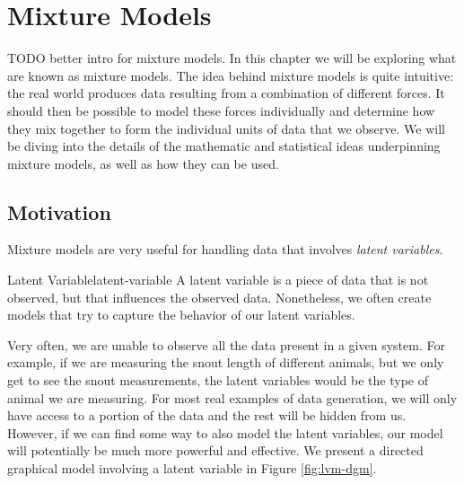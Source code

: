 \chapter{Mixture Models}
TODO better intro for mixture models.
In this chapter we will be exploring what are known as mixture models. The idea behind mixture models is quite intuitive: the real world produces data resulting from a combination of different forces. It should then be possible to model these forces individually and determine how they mix together to form the individual units of data that we observe. We will be diving into the details of the mathematic and statistical ideas underpinning mixture models, as well as how they can be used.

\section{Motivation}
Mixture models are very useful for handling data that involves \textit{latent variables}.

\begin{definition}{Latent Variable}{latent-variable}
    A latent variable is a piece of data that is not observed, but that influences the observed data. Nonetheless, we often create models that try to capture the behavior of our latent variables.
\end{definition}

Very often, we are unable to observe all the data present in a given system. For example, if we are measuring the snout length of different animals, but we only get to see the snout measurements, the latent variables would be the type of animal we are measuring. For most real examples of data generation, we will only have access to a portion of the data and the rest will be hidden from us. However, if we can find some way to also model the latent variables, our model will potentially be much more powerful and effective. We present a directed graphical model involving a latent variable in Figure \ref{fig:lvm-dgm}.

